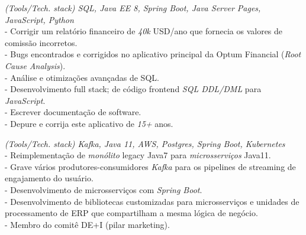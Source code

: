 \documentclass[]{CV-JuanCamiloFlorez}
\begin{document}
\begin{minipage}[t]{0.66\textwidth}
    \textit{(Tools/Tech. stack) SQL, Java EE 8, Spring Boot, Java Server Pages, JavaScript, Python} \\
        - Corrigir um relatório financeiro de \textit{40k} USD/ano que fornecia os valores de comissão incorretos. \\
        - Bugs encontrados e corrigidos no aplicativo principal da Optum Financial (\textit{Root Cause Analysis}). \\
        - Análise e otimizações avançadas de SQL. \\
        - Desenvolvimento full stack; de código frontend \textit{SQL DDL/DML} para \textit{JavaScript}. \\
        - Escrever documentação de software. \\
        - Depure e corrija este aplicativo de \textit{15+} anos. \\
        \sectionsep

    \textit{(Tools/Tech. stack) Kafka, Java 11, AWS, Postgres, Spring Boot, Kubernetes} \\
        - Reimplementação de \textit{monólito} legacy Java7 para \textit{microsserviços} Java11. \\
        - Grave vários produtores-consumidores \textit{Kafka} para os pipelines de streaming de engajamento do usuário. \\
        - Desenvolvimento de microsserviços com \textit{Spring Boot}. \\
        - Desenvolvimento de bibliotecas customizadas para microsserviços e unidades de processamento de ERP que compartilham a mesma lógica de negócio. \\
        - Membro do comitê DE+I (pilar marketing). \\
        \sectionsep


\end{minipage}
\end{document}

